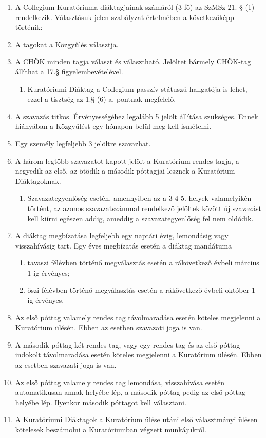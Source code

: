 \documentclass{../styles/rulebook}
\begin{document}
\begin{enumerate}
	\item A Collegium Kuratóriuma diáktagjainak számáról (3 fő) az SzMSz 21. § (1) rendelkezik. Választásuk jelen szabályzat értelmében a következőképp történik:
	\item A tagokat a Közgyűlés választja.
	\item A CHÖK minden tagja választ és választható. Jelöltet bármely CHÖK-tag állíthat a 17.§ figyelembevételével.
	\begin{enumerate} 
		\item Kuratóriumi Diáktag a Collegium passzív státuszú hallgatója is lehet, ezzel a tisztség az 1.§ (6) a. pontnak megfelelő.
	\end{enumerate}
	\item A szavazás titkos. Érvényességéhez legalább 5 jelölt állítása szükséges. Ennek hiányában a Közgyűlést egy hónapon belül meg kell ismételni.
	\item Egy személy legfeljebb 3 jelöltre szavazhat.
	\item A három legtöbb szavazatot kapott jelölt a Kuratórium rendes tagja, a negyedik az első, az ötödik a második póttagjai lesznek a Kuratórium Diáktagoknak.
	\begin{enumerate} 
		\item Szavazategyenlőség esetén, amennyiben az a 3-4-5. helyek valamelyikén történt, az azonos szavazatszámmal rendelkező jelöltek között új szavazást kell kiírni egészen addig, ameddig a szavazategyenlőség fel nem oldódik.
	\end{enumerate}
	\item A diáktag megbízatása legfeljebb egy naptári évig, lemondásig vagy visszahívásig tart. Egy éves megbízatás esetén a diáktag mandátuma
	\begin{enumerate}
		\item tavaszi félévben történő megválasztás esetén a rákövetkező évbeli március 1-ig érvényes;
		\item őszi félévben történő megválasztás esetén a rákövetkező évbeli október 1-ig érvényes.
	\end{enumerate}
	\item Az első póttag valamely rendes tag távolmaradása esetén köteles megjelenni a Kuratórium ülésén. Ebben az esetben szavazati joga is van.
	\item A második póttag két rendes tag, vagy egy rendes tag és az első póttag indokolt távolmaradása esetén köteles megjelenni a Kuratórium ülésén. Ebben az esetben szavazati joga is van.
	\item Az első póttag valamely rendes tag lemondása, visszahívása esetén automatikusan annak helyébe lép, a második póttag pedig az első póttag helyébe lép. Ilyenkor második póttagot kell választani.
	\item A Kuratóriumi Diáktagok a Kuratórium ülése utáni első választmányi ülésen kötelesek beszámolni a Kuratóriumban végzett munkájukról.
\end{enumerate}
\end{document}
